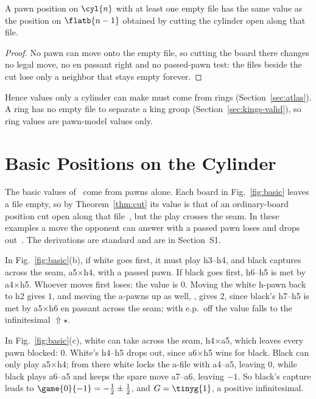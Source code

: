 \begin{theorem}\label{thm:cut}
A pawn position on $\cyl{n}$ with at least one empty file has the same value as the position on
$\flatb{n-1}$ obtained by cutting the cylinder open along that file.
\end{theorem}

\begin{proof}
No pawn can move onto the empty file, so cutting the board there changes no legal move, no en passant right and
no passed-pawn test: the files beside the cut lose only a neighbor that stays empty forever.
\end{proof}

Hence values only a cylinder can make must come from rings (Section~\ref{sec:atlas}). A ring has no
empty file to separate a king group (Section~\ref{sec:kings-valid}), so ring values are pawn-model values only.

\section{Basic Positions on the Cylinder}\label{sec:basic}

The basic values of~\cite{Study2025} come from pawns alone. Each board in Fig.~\ref{fig:basic} leaves a file
empty, so by Theorem~\ref{thm:cut} its value is that of an ordinary-board position cut open along that
file~\cite{Elkies1996,WuYuLandry2010}, but the play crosses the seam. In these examples a move the opponent can answer with a
passed pawn loses and drops out~\cite{WinningWays,WuYuLandry2010}. The derivations are standard and are in Section~S1.

In Fig.~\ref{fig:basic}(b), if white goes first, it must play h3--h4, and black captures across the seam,
a5$\times$h4, with a passed pawn. If black goes first, h6--h5 is met by a4$\times$h5. Whoever moves first loses:
the value is $0$. Moving the white h-pawn back to h2 gives $1$, and moving the a-pawns up as well,
, gives $2$, since black's h7--h5 is met by a5$\times$h6 en passant across the seam;
with e.p.\ off the value falls to the infinitesimal ${\Uparrow}\star$.

In Fig.~\ref{fig:basic}(c), white can take across the seam, h4$\times$a5, which leaves every pawn blocked: $0$.
White's h4--h5 drops out, since a6$\times$h5 wins for black. Black can only play a5$\times$h4; from there white
locks the a-file with a4--a5, leaving $0$, while black plays a6--a5 and keeps the spare move a7--a6, leaving
$-1$. So black's capture leads to $\game{0}{-1}=-\tfrac12\pm\tfrac12$, and $G=\tinyg{1}$, a positive
infinitesimal.
